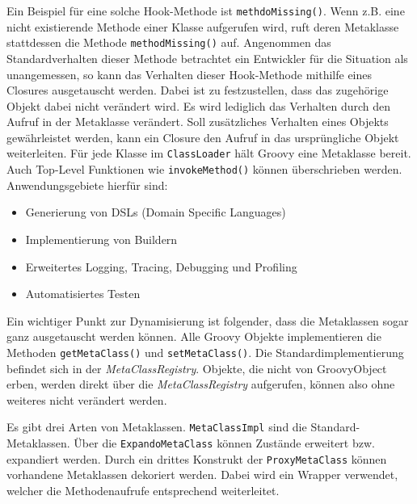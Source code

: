 Ein Beispiel für eine solche Hook-Methode ist \texttt{methdoMissing()}. Wenn z.B. eine nicht existierende Methode einer Klasse aufgerufen wird, ruft deren Metaklasse stattdessen die Methode \texttt{methodMissing()} auf.
Angenommen das Standardverhalten dieser Methode betrachtet ein Entwickler für die Situation als unangemessen, so kann das Verhalten dieser Hook-Methode mithilfe eines Closures ausgetauscht werden. 
Dabei ist zu festzustellen, dass das zugehörige Objekt dabei nicht verändert wird. 
Es wird lediglich das Verhalten durch den Aufruf in der Metaklasse verändert. 
Soll zusätzliches Verhalten eines Objekts gewährleistet werden, kann ein Closure den Aufruf in das ursprüngliche Objekt weiterleiten.
Für jede Klasse im \texttt{ClassLoader} hält Groovy eine Metaklasse bereit. Auch Top-Level Funktionen wie \texttt{invokeMethod()} können überschrieben werden.
Anwendungsgebiete hierfür sind:

\begin{itemize}[nosep]
	\item Generierung von DSLs (Domain Specific Languages)
	\item Implementierung von Buildern
	\item Erweitertes Logging, Tracing, Debugging und Profiling
	\item Automatisiertes Testen
\end{itemize}

Ein wichtiger Punkt zur Dynamisierung ist folgender, dass die Metaklassen sogar ganz ausgetauscht werden können.
Alle Groovy Objekte implementieren die Methoden \texttt{getMetaClass()} und \texttt{setMetaClass()}. 
Die Standardimplementierung befindet sich in der \textit{MetaClassRegistry}. 
Objekte, die nicht von GroovyObject erben, werden direkt über die \textit{MetaClassRegistry} aufgerufen, können also ohne weiteres nicht verändert werden. 

Es gibt drei Arten von Metaklassen. \texttt{MetaClassImpl} sind die Standard-Metaklassen.
Über die \texttt{ExpandoMetaClass} können Zustände erweitert bzw. expandiert werden. 
Durch ein drittes Konstrukt der \texttt{ProxyMetaClass} können vorhandene Metaklassen dekoriert werden. 
Dabei wird ein Wrapper verwendet, welcher die Methodenaufrufe entsprechend weiterleitet.




